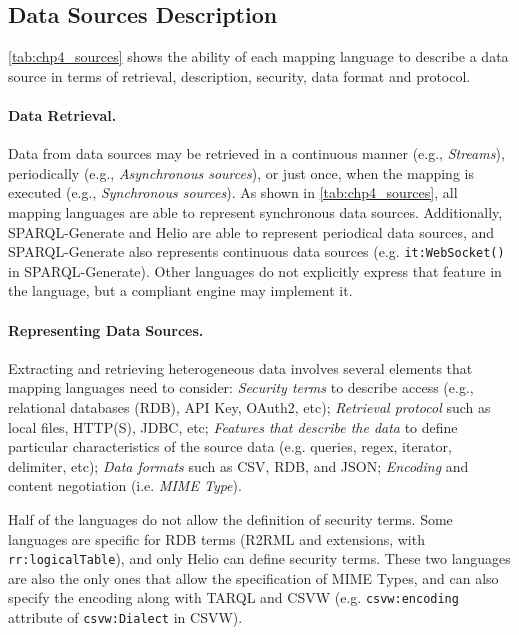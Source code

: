 \subsection{Data Sources Description}


\cref{tab:chp4_sources} shows the ability of each mapping language to describe a data source in terms of retrieval, description, security, data format and protocol. 


\noindent\paragraph{\textbf{Data Retrieval.}} Data from data sources may be retrieved in a continuous manner (e.g., \textit{Streams}),  periodically (e.g., \textit{Asynchronous sources}), or just once, when the mapping is executed (e.g., \textit{Synchronous sources}). As shown in \cref{tab:chp4_sources}, all mapping languages are able to represent synchronous data sources. Additionally, SPARQL-Generate and Helio are able to represent periodical data sources, and SPARQL-Generate also represents continuous data sources (e.g. \texttt{it:WebSocket()} in SPARQL-Generate). Other languages do not explicitly express that feature in the language, but a compliant engine may implement it.

\noindent\paragraph{\textbf{Representing Data Sources.}} Extracting and retrieving heterogeneous data involves several elements that mapping languages need to consider: \textit{Security terms} to describe access (e.g., relational databases (RDB), API Key, OAuth2, etc); \textit{Retrieval protocol} such as local files, HTTP(S), JDBC, etc; \textit{Features that describe the data} to define particular characteristics of the source data (e.g. queries, regex, iterator, delimiter, etc); \textit{Data formats} such as CSV, RDB, and JSON; \textit{Encoding} and content negotiation (i.e. \textit{MIME Type}). 

Half of the languages do not allow the definition of security terms. Some languages are specific for RDB terms (R2RML and extensions, with \texttt{rr:logical\-Table}), and only Helio can define security terms. These two languages are also the only ones that allow the specification of MIME Types, and can also specify the encoding along with TARQL and CSVW (e.g. \texttt{csvw:encoding} attribute of \texttt{csvw:Dialect} in CSVW). 

